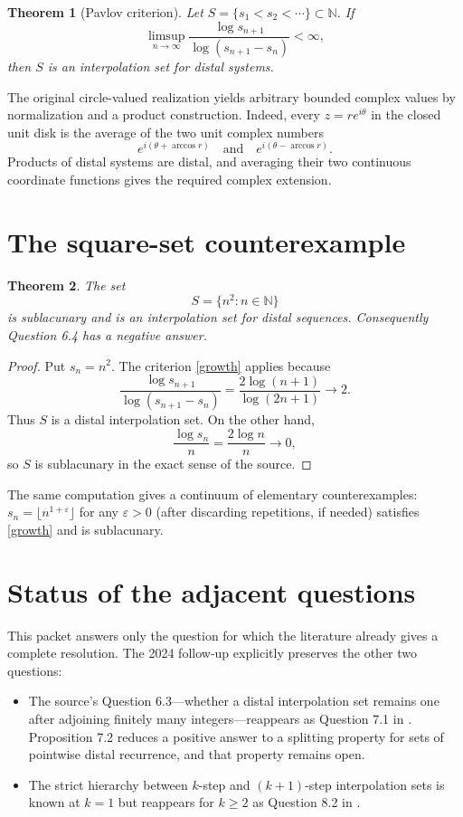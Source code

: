\documentclass[11pt]{article}
\newtheorem{theorem}{Theorem}
\newcommand{\N}{\mathbb N}
\begin{document}
\begin{theorem}[Pavlov criterion]\label{criterion}
Let $S=\{s_1<s_2<\cdots\}\subset\N$.  If
\begin{equation}\label{growth}
 \limsup_{n\to\infty}
 \frac{\log s_{n+1}}{\log(s_{n+1}-s_n)}<\infty,
\end{equation}
then $S$ is an interpolation set for distal systems.
\end{theorem}

The original circle-valued realization yields arbitrary bounded complex
values by normalization and a product construction.  Indeed, every
$z=re^{i\theta}$ in the closed unit disk is the average of the two unit
complex numbers
\[
 e^{i(\theta+\arccos r)}
 \quad\text{and}\quad
 e^{i(\theta-\arccos r)}.
\]
Products of distal systems are distal, and averaging their two continuous
coordinate functions gives the required complex extension.

\section{The square-set counterexample}

\begin{theorem}
The set
\[
 S=\{n^2:n\in\N\}
\]
is sublacunary and is an interpolation set for distal sequences.
Consequently Question 6.4 has a negative answer.
\end{theorem}

\begin{proof}
Put $s_n=n^2$.  The criterion \eqref{growth} applies because
\[
 \frac{\log s_{n+1}}{\log(s_{n+1}-s_n)}
 =\frac{2\log(n+1)}{\log(2n+1)}\longrightarrow2.
\]
Thus $S$ is a distal interpolation set.  On the other hand,
\[
 \frac{\log s_n}{n}=\frac{2\log n}{n}\longrightarrow0,
\]
so $S$ is sublacunary in the exact sense of the source.
\end{proof}

The same computation gives a continuum of elementary counterexamples:
$s_n=\lfloor n^{1+\varepsilon}\rfloor$ for any $\varepsilon>0$ (after
discarding repetitions, if needed) satisfies \eqref{growth} and is
sublacunary.

\section{Status of the adjacent questions}

This packet answers only the question for which the literature already gives
a complete resolution.  The 2024 follow-up explicitly preserves the other
two questions:
\begin{itemize}
\item The source's Question 6.3---whether a distal interpolation set remains
one after adjoining finitely many integers---reappears as Question 7.1 in
\cite{KLMPR}.  Proposition 7.2 reduces a positive answer to a splitting
property for sets of pointwise distal recurrence, and that property remains
open.
\item The strict hierarchy between $k$-step and $(k+1)$-step interpolation
sets is known at $k=1$ but reappears for $k\ge2$ as Question 8.2 in
\cite{KLMPR}.
\end{itemize}
\end{document}
